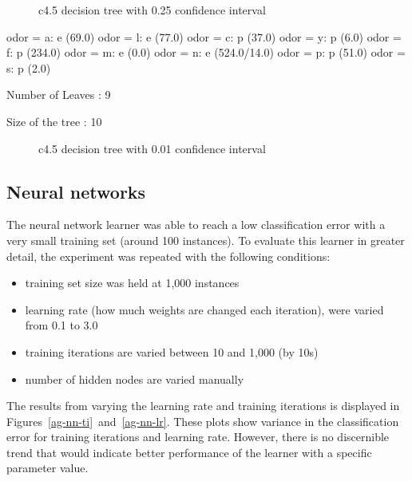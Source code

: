 \documentclass{sig-alternate}
\begin{document}
\begin{figure}[!htbp]
    \centering
    \theverbbox
    \caption{c4.5 decision tree with 0.25 confidence interval \label{dt-c025}}
\end{figure}


\begin{verbbox}

odor = a: e (69.0)
odor = l: e (77.0)
odor = c: p (37.0)
odor = y: p (6.0)
odor = f: p (234.0)
odor = m: e (0.0)
odor = n: e (524.0/14.0)
odor = p: p (51.0)
odor = s: p (2.0)

Number of Leaves  :     9

Size of the tree :  10

\end{verbbox}

\begin{figure}[!htbp]
    \centering
    \theverbbox
    \caption{c4.5 decision tree with 0.01 confidence interval \label{dt-c001}}
\end{figure}

\subsection{Neural networks}

The neural network learner was able to reach a low classification error with a very small training set (around 100 instances). To evaluate this learner in greater detail, the experiment was repeated with the following conditions:

\begin{itemize}
    \item training set size was held at 1,000 instances
    \item learning rate (how much weights are changed each iteration), were varied from 0.1 to 3.0
    \item training iterations are varied between 10 and 1,000 (by 10s)
    \item number of hidden nodes are varied manually
\end{itemize}

The results from varying the learning rate and training iterations  is displayed in Figures~\ref{ag-nn-ti}~and~\ref{ag-nn-lr}. These plots show variance in the classification error for training iterations and learning rate. However, there is no discernible trend that would indicate better performance of the learner with a specific parameter value.
\end{document}
